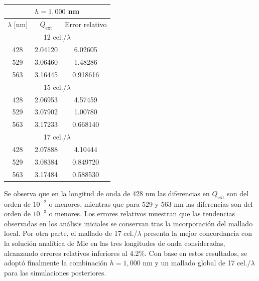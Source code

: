 \begin{center}
\begin{minipage}[t]{0.48\textwidth}
			\begin{tabular}{ccc}
				\hline
				\multicolumn{3}{c}{$h=1,000$ nm}\\ 
				\hline
				$\lambda$ [nm] & $Q_{\text{ext}}$ & Error relativo\\
				\hline
				\multicolumn{3}{c}{12 cel./$\lambda$} \\
				\hline
				428 & 2.04120 & 6.02605 \\
				529 & 3.06460 & 1.48286 \\
				563 & 3.16445 & 0.918616 \\
				\hline
				\multicolumn{3}{c}{15 cel./$\lambda$} \\
				\hline
				428 & 2.06953 & 4.57459 \\
				529 & 3.07902 & 1.00780 \\
				563 & 3.17233 & 0.668140 \\
				\hline
				\multicolumn{3}{c}{17 cel./$\lambda$} \\
				\hline
				428 & 2.07888 & 4.10444 \\
				529 & 3.08384 & 0.849720 \\
				563 & 3.17484 & 0.588530 \\
				\hline
			\end{tabular}
			\label{table:convergencia_malla}
			\vspace{0.2cm}
		\end{minipage}
		
	\end{center}
	\vspace{0.4cm} %



Se observa que en la longitud de onda de 428 nm las diferencias en $Q_{\text{ext}}$ son del orden de $10^{-2}$ o menores, mientras que para 529 y 563 nm las diferencias son del orden de $10^{-3}$ o menores. Los errores relativos muestran que las tendencias observadas en los análisis iniciales se conservan tras la incorporación del mallado local. Por otra parte, el mallado de 17 cel./$\lambda$ presenta la mejor concordancia con la solución analítica de Mie en las tres longitudes de onda consideradas, alcanzando errores relativos inferiores al 4.2\%. Con base en estos resultados, se adoptó finalmente la combinación $h=1,000$ nm y un mallado global de 17 cel./$\lambda$ para las simulaciones posteriores.



